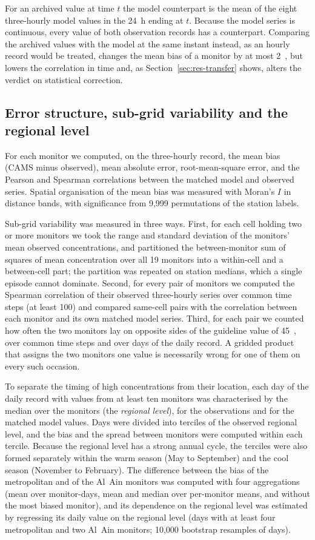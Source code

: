 For an archived value at time $t$ the model counterpart is the mean of the eight three-hourly
model values in the 24~h ending at $t$. Because the model series is continuous, every value of
both observation records has a counterpart. Comparing the archived values with the model at the
same instant instead, as an hourly record would be treated, changes the mean bias of a monitor by
at most 2~\ugm{}, but lowers the correlation in time and, as Section~\ref{sec:res-transfer}
shows, alters the verdict on statistical correction.

\subsection{Error structure, sub-grid variability and the regional level}

For each monitor we computed, on the three-hourly record, the mean bias (CAMS minus observed),
mean absolute error, root-mean-square error, and the Pearson and Spearman correlations between
the matched model and observed series. Spatial organisation of the mean bias was measured with
Moran's $I$ \citep{moran1950} in distance bands, with significance from 9,999 permutations of the station labels.

Sub-grid variability was measured in three ways. First, for each cell holding two or more
monitors we took the range and standard deviation of the monitors' mean observed concentrations,
and partitioned the between-monitor sum of squares of mean concentration over all 19 monitors
into a within-cell and a between-cell part; the partition was repeated on station medians, which
a single episode cannot dominate. Second, for every pair of monitors we computed the Spearman correlation \citep{spearman1904} of their observed three-hourly series over common time steps (at least 100) and
compared same-cell pairs with the correlation between each monitor and its own matched model
series. Third, for each pair we counted how often the two monitors lay on opposite sides of the
guideline value of 45~\ugm{}, over common time steps and over days of the daily record. A gridded
product that assigns the two monitors one value is necessarily wrong for one of them on every such
occasion.

To separate the timing of high concentrations from their location, each day of the daily record
with values from at least ten monitors was characterised by the median over the monitors (the
\emph{regional level}), for the observations and for the matched model values. Days were divided
into terciles of the observed regional level, and the bias and the spread between monitors were
computed within each tercile. Because the regional level has a strong annual cycle, the terciles
were also formed separately within the warm season (May to September) and the cool season
(November to February). The difference between the bias of the metropolitan and of the Al~Ain
monitors was computed with four aggregations (mean over monitor-days, mean and median over
per-monitor means, and without the most biased monitor), and its dependence on the regional level
was estimated by regressing its daily value on the regional level (days with at least four
metropolitan and two Al~Ain monitors; 10,000 bootstrap resamples of days).

